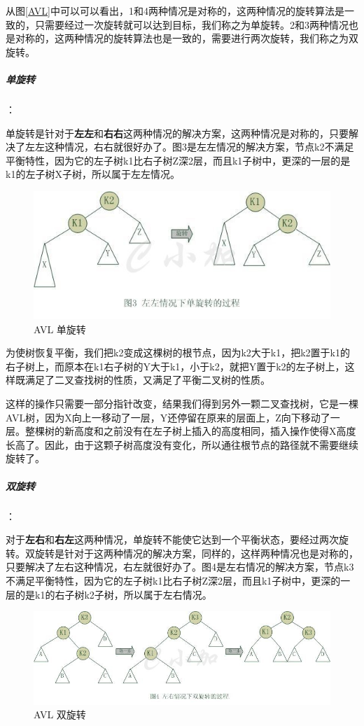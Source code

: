 \documentclass[UTF8,a4paper,12pt]{ctexbook}
\begin{document}
				从图\ref{AVL}中可以可以看出，1和4两种情况是对称的，这两种情况的旋转算法是一致的，只需要经过一次旋转就可以达到目标，我们称之为单旋转。2和3两种情况也是对称的，这两种情况的旋转算法也是一致的，需要进行两次旋转，我们称之为双旋转。
					
				\subparagraph{单旋转}：
				
					单旋转是针对于\textbf{左左}和\textbf{右右}这两种情况的解决方案，这两种情况是对称的，只要解决了左左这种情况，右右就很好办了。图3是左左情况的解决方案，节点k2不满足平衡特性，因为它的左子树k1比右子树Z深2层，而且k1子树中，更深的一层的是k1的左子树X子树，所以属于左左情况。
						\begin{figure}[H]
							\centering
							\includegraphics[scale = 0.8]{Rotate_1.jpg}
							\caption{AVL 单旋转}
						\end{figure}
						
					为使树恢复平衡，我们把k2变成这棵树的根节点，因为k2大于k1，把k2置于k1的右子树上，而原本在k1右子树的Y大于k1，小于k2，就把Y置于k2的左子树上，这样既满足了二叉查找树的性质，又满足了平衡二叉树的性质。
					
					这样的操作只需要一部分指针改变，结果我们得到另外一颗二叉查找树，它是一棵AVL树，因为X向上一移动了一层，Y还停留在原来的层面上，Z向下移动了一层。整棵树的新高度和之前没有在左子树上插入的高度相同，插入操作使得X高度长高了。因此，由于这颗子树高度没有变化，所以通往根节点的路径就不需要继续旋转了。
						
				\subparagraph{双旋转}：
				
					对于\textbf{左右}和\textbf{右左}这两种情况，单旋转不能使它达到一个平衡状态，要经过两次旋转。双旋转是针对于这两种情况的解决方案，同样的，这样两种情况也是对称的，只要解决了左右这种情况，右左就很好办了。图4是左右情况的解决方案，节点k3不满足平衡特性，因为它的左子树k1比右子树Z深2层，而且k1子树中，更深的一层的是k1的右子树k2子树，所以属于左右情况。
					\begin{figure}[H]
						\centering
						\includegraphics[scale = 0.8]{Rotate_2.jpg}
						\caption{AVL 双旋转}
					\end{figure}
					
\end{document}
